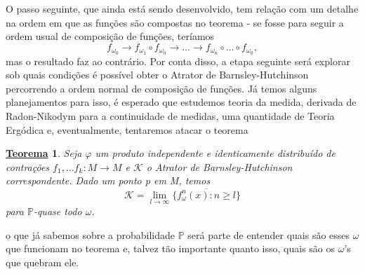 \documentclass[12pt]{article}
\newtheorem*{theorem*}{\underline{Teorema}}
\theoremstyle{definition}
\begin{document}
O passo seguinte, que ainda está sendo desenvolvido, tem relação com um detalhe na ordem em que as funções são compostas no teorema - se fosse para seguir a ordem
usual de composição de funções, teríamos
\[
	f_{\omega_{0}}\rightarrow f_{\omega_{1}}\circ f_{\omega_{0}}\rightarrow \dotsc \rightarrow f_{\omega_{n}}\circ \dotsc \circ f_{\omega_{0}},
\]
mas o resultado faz ao contrário. Por conta disso, a etapa seguinte será explorar sob quais condições é possível obter o Atrator de Barnsley-Hutchinson percorrendo a ordem normal
de composição de funções. Já temos alguns planejamentos para isso, é esperado que estudemos teoria da medida, derivada de Radon-Nikodym para a continuidade de medidas, uma quantidade de
Teoria Ergódica e, eventualmente, tentaremos atacar o teorema
\begin{theorem*}
	Seja \(\varphi \) um produto independente e identicamente distribuído de contrações \(f_{1},\dotsc f_{k}:M\rightarrow M\) e \(\mathcal{K}\) o Atrator de Barnsley-Hutchinson correspondente. Dado um
	ponto p em M, temos
	\[
		\mathcal{K}=\lim_{l\to \infty}\overline{\{f_{\omega }^{n}(x): n\geq l\}}
	\]
	para \(\mathbb{P}\)-quase todo \(\omega \).
\end{theorem*}
o que já sabemos sobre a probabilidade \(\mathbb{P}\) será parte de entender quais são esses \(\omega \) que funcionam no teorema e, talvez tão importante quanto isso,
quais são os \(\omega \)'s que quebram ele.
\end{document}
